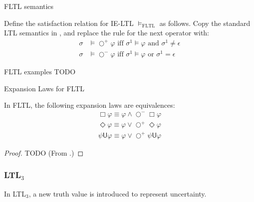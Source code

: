 \documentclass[a4paper]{article}
\newcommand{\U}{\mathsf{U}}
\newcommand{\tand}{\text{ and }}
\newcommand{\tor}{\text{ or }}
\newcommand{\tiff}{\text{ iff }}
\newcommand{\sn}{\bigcirc^+}
\newcommand{\wn}{\bigcirc^-}
\newcommand{\ltlt}{LTL$_3$}
\begin{document}
\begin{defn}{FLTL semantics}

  Define the satisfaction relation for IE-LTL $\vDash_{\text{FLTL}}$ as follows.
  Copy the standard LTL semantics in , and replace the rule for the next operator with:
  \begin{align*}
    \sigma&\vDash\sn\varphi \tiff \sigma^1\vDash\varphi \tand \sigma^1 \neq \epsilon\\
    \sigma&\vDash\wn\varphi \tiff \sigma^1\vDash\varphi \tor \sigma^1 = \epsilon
  \end{align*}
\end{defn}

\begin{eg}{FLTL examples}
  TODO
\end{eg}

\begin{lem}{Expansion Laws for FLTL}\label{fltlexp}

  In FLTL, the following expansion laws are equivalences:
  \begin{align}
    \Box \varphi \equiv \varphi \land \wn \Box \varphi \label{felBox}\\
    \Diamond \varphi \equiv \varphi \lor \sn \Diamond \varphi\label{felDiamond}\\
    \psi \U \varphi \equiv \varphi \lor \sn \psi \U \varphi\label{felU}
  \end{align}

\end{lem}

\begin{proof}
  TODO (From \autocite{bauer2010comparing}.)
\end{proof}

\subsubsection{\ltlt} In \ltlt, a new truth value is introduced to represent uncertainty.
\end{document}

